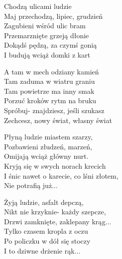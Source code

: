 
\begin{text}
    Chodzą ulicami ludzie\\
    Maj przechodzą, lipiec, grudzień\\
    Zagubieni wśród ulic bram\\
    Przemarznięte grzeją dłonie\\
    Dokądś pędzą, za czymś gonią\\
    I budują wciąż domki z kart

    \vin A tam w mech odziany kamień\\
    \vin Tam zaduma w wiatru graniu\\
    \vin Tam powietrze ma inny smak\\
    \vin Porzuć kroków rytm na bruku\\
    \vin Spróbuj- znajdziesz, jeśli szukasz\\
    \vin Zechcesz, nowy świat, własny świat

    Płyną ludzie miastem szarzy,\\
    Pozbawieni złudzeń, marzeń,\\
    Omijają wciąż główny nurt.\\
    Kryją się w swych norach krecich\\
    I śnic nawet o karecie, co lśni złotem,\\
    Nie potrafią już...

    Żyją ludzie, asfalt depczą,\\
    Nikt nie krzyknie- każdy szepcze,\\
    Drzwi zamknięte, zaklepany krąg...\\
    Tylko czasem kropla z oczu\\
    Po policzku w dół się stoczy\\
    I to dziwne drżenie rąk...
\end{text}
\begin{chord}

\end{chord}